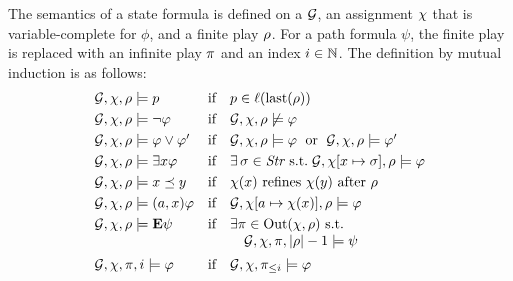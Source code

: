 \begin{definition}%
\label{def-SLi-semantics}
The semantics of a state formula is defined on a \CGS $\CGS$, an
assignment  $\chi$ that is variable-complete for $\phi$, and a
finite play $\rho$. For a path formula $\psi$, the finite play is
replaced with an infinite play $\pi$ and an index $i\in\mathbb N$. The
definition by mutual induction is as follows:
\begingroup
\allowdisplaybreaks
\[
\begin{array}{lcl}
 \CGS,\assign,\fplay\modelsSL p & \text{if} & p\in\val(\last(\fplay))\\[3pt]
 \CGS,\assign,\fplay\modelsSL \neg\phi & \text{if} &
  \CGS,\assign,\fplay\not\modelsSL\phi\\[3pt]
 \CGS,\assign,\fplay\modelsSL \phi\ou\phi' & \text{if} &
  \CGS,\assign,\fplay\modelsSL\phi \;\text{ or }\;
  \CGS,\assign,\fplay\modelsSL\phi' \\[3pt]
 \CGS,\assign,\fplay\modelsSL\exists\var\phi  & \text{if} & 
\exists\,   \strat\in\setstratnd \;\text{s.t.} \;
                                                          \CGS,\assign[\var\mapsto\strat],\fplay\modelsSL
                                                          \phi\\[3pt]
   \CGS,\assign,\fplay\modelsSL \var\refines\varb & \text{if} &
                                                              \assign(\var)
                                                              \mbox{
                                                              refines
                                                                }\assign(\varb)
  \mbox{ after }\fplay\\[3pt]
 \CGS,\assign,\fplay\modelsSL \bind{\var}\phi & \text{if} &
 \CGS,\assign[\ag\mapsto\assign(\var)],\fplay\modelsSL \phi\\[3pt]  
 \CGS,\assign,\fplay\modelsSL \Eout\psi & \text{if} & \exists\iplay \in
                                                         \out(\assign,\fplay)
                                                         \text{ s.t. }
  \\
  & &\quad   \CGS,\assign,\iplay,|\fplay|-1\modelsSL \psi\\[5pt]
    \CGS,\assign,\iplay,i\modelsSL \phi & \text{if} &
                                                         \CGS,\assign,\iplay_{\leq i}\modelsSL\phi\\[3pt]

\end{array}\]
\end{definition}

